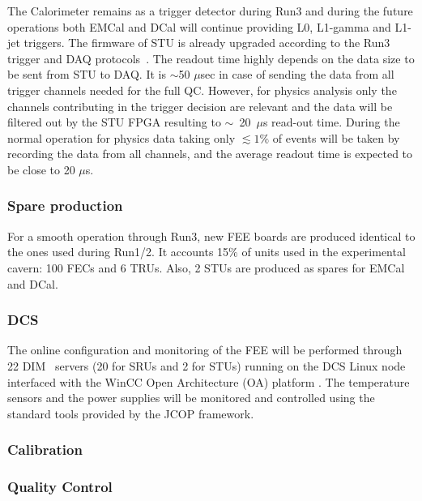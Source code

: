 %
The Calorimeter remains as a trigger detector during Run3 and during the future operations both EMCal and DCal will continue
providing L0, L1-gamma and L1-jet triggers. The firmware of STU is already upgraded according to the Run3 trigger and DAQ protocols~\cite{Antonioli:2013ppp}. 
The readout time highly depends on the data size to be sent from STU to DAQ. It is $\sim$50 $\mu$sec in case of sending the data from all trigger channels needed for the full QC.  However, for physics analysis only the channels contributing in the trigger decision are relevant and the data will be filtered out by the STU FPGA resulting to 
$\sim$~20~$\mu$s read-out time. During the normal operation for physics data taking only $\lesssim 1 \%$ of events will be taken by recording the data from all channels, and the 
average readout time is expected to be close to 20 $\mu$s.
%
\subsubsection{Spare production}
For a smooth operation through Run3, new FEE boards are produced identical to the ones used during Run1/2. 
It accounts 15$\%$ of units used in the experimental cavern: 100 FECs and 6 TRUs. Also, 2 STUs are produced as spares for EMCal and DCal.
%
\subsubsection{DCS}
The online configuration and monitoring of the FEE will be performed through 22 DIM~\cite{Gaspar:1994ooj} servers (20 for SRUs and 2 for STUs) running on the DCS Linux node interfaced with the WinCC Open Architecture (OA) platform . 
The temperature sensors and the power supplies will be monitored and controlled using the standard tools provided by the JCOP framework. 

\subsubsection{Calibration}

\subsubsection{Quality Control}



